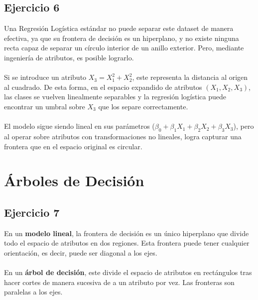 \documentclass[a4paper,12pt]{article}
\begin{document}
        \subsection*{Ejercicio 6}
            \noindent Una Regresión Logística estándar no puede separar este dataset de manera efectiva, ya que su frontera de decisión es un hiperplano, y no existe ninguna recta capaz de separar un círculo interior de un anillo exterior. Pero, mediante ingeniería de atributos, es posible lograrlo. \\
            \\
            \noindent Si se introduce un atributo \(X_3 = X_1^2 + X_2^2\), este representa la distancia al origen al cuadrado. De esta forma, en el espacio expandido de atributos $(X_1, X_2, X_3)$, las clases se vuelven linealmente separables y la regresión logística puede encontrar un umbral sobre $X_3$ que los separe correctamente. \\
            \\
            \noindent El modelo sigue siendo lineal en sus parámetros ($\beta_0 + \beta_1 X_1 + \beta_2 X_2 + \beta_3 X_3$), pero al operar sobre atributos con transformaciones no lineales, logra capturar una frontera que en el espacio original es circular.
    \section*{Árboles de Decisión}
        \subsection*{Ejercicio 7}
            \noindent En un \textbf{modelo lineal}, la frontera de decisión es un único hiperplano que divide todo el espacio de atributos en dos regiones. Esta frontera puede tener cualquier orientación, es decir, puede ser diagonal a los ejes. \\
            \\
            \noindent En un \textbf{árbol de decisión}, este divide el espacio de atributos en rectángulos tras hacer cortes de manera sucesiva de a un atributo por vez. Las fronteras son paralelas a los ejes.
\end{document}
